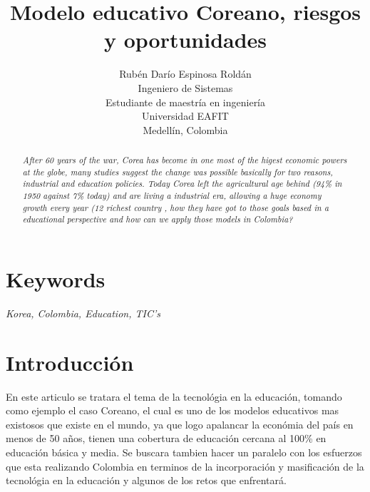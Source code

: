 \documentclass[conference]{IEEEtran}
\begin{document}
%
\title{\Large\bf Modelo educativo Coreano, riesgos y oportunidades}


\author{Rubén Darío Espinosa Roldán  \\
  Ingeniero de Sistemas\\
  Estudiante de maestría en ingeniería\\
  Universidad EAFIT  \\
  Medellín, Colombia}

\maketitle

\begin{abstract}
\em
After 60 years of the war, Corea has become in one most of the higest economic powers at the globe, many studies suggest the change was possible basically for two reasons, industrial and education policies. Today Corea left the agricultural age behind (94\% in 1950 against 7\% today) and are living a industrial era, allowing a huge economy growth every year (12 richest country \cite{korea:rich}, how they have got to those goals based in a educational perspective and how can we apply those models in Colombia? 
\end{abstract}

\section*{Keywords}
\emph{
Korea, Colombia, Education, TIC's
}

\section{Introducción}
En este articulo se tratara el tema de la tecnológia en la educación, tomando como ejemplo el caso Coreano, el cual es uno de los modelos educativos mas existosos que existe en el mundo, ya que logo apalancar la económia del país en menos de 50 años, tienen una cobertura de educación cercana al 100\% en educación básica y media. Se buscara tambien hacer un paralelo con los esfuerzos que esta realizando Colombia en terminos de la incorporación y masificación de la tecnológia en la educación y algunos de los retos que enfrentará. 
\end{document}
